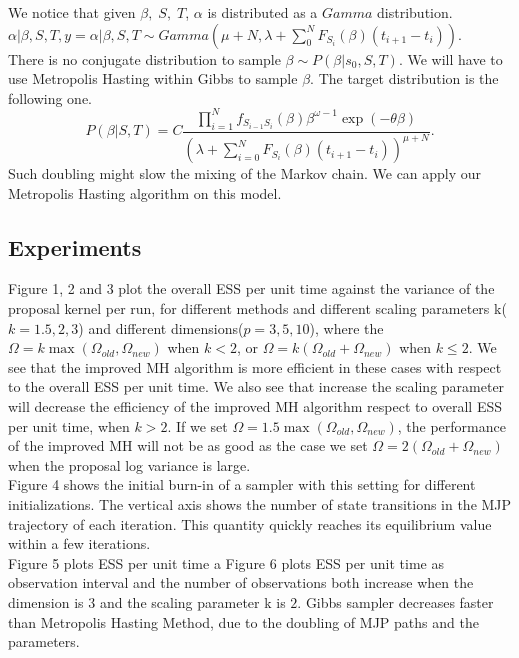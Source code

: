 We notice that given $\beta,\; S,\; T$, $\alpha$ is distributed as a $Gamma$ distribution.\\
$\alpha | \beta, S, T, y  = \alpha | \beta, S, T \sim Gamma(\mu + N, \lambda + \sum_{0}^NF_{S_i}(\beta)(t_{i + 1} - t_i))$.\\
There is no conjugate distribution to sample $\beta \sim P(\beta| s_0, S, T)$. We will have to use Metropolis Hasting within Gibbs to sample $\beta$. The target distribution is the following one.
$$ P(\beta | S, T) = C \frac{\prod_{i = 1}^N f_{S_{i -1}S_i}(\beta)\beta^{\omega - 1} \exp(-\theta \beta)}{(\lambda + \sum_{i = 0}^{N} F_{S_i}(\beta)(t_{i + 1} - t_i))^{\mu + N}}.$$
Such doubling might slow the mixing of the Markov chain. We can apply our Metropolis Hasting algorithm on this model.
\subsection{Experiments}
Figure 1, 2 and 3 plot the overall  ESS per unit time against the variance of the proposal kernel per run, for different methods and different scaling parameters k($k = 1.5, 2, 3$) and different dimensions($p = 3, 5, 10$), where the  $\Omega = k \max(\Omega_{old}, \Omega_{new})$ when $k < 2$, or $\Omega = k (\Omega_{old} + \Omega_{new})$ when $k \leq 2$. We see that the improved MH algorithm is more efficient in these cases with respect to the overall ESS per unit time. We also see that increase the scaling parameter will decrease the efficiency of the improved MH algorithm respect to overall ESS per unit time, when $k > 2$. If we set $\Omega = 1.5 \max(\Omega_{old}, \Omega_{new})$, the performance of the improved MH will not be as good as the case we set $\Omega = 2(\Omega_{old} + \Omega_{new})$ when the proposal log variance is large.\\
Figure 4 shows the initial burn-in of a sampler with this setting for different initializations. The vertical axis shows the number of state transitions in the MJP trajectory of each iteration. This quantity quickly reaches its equilibrium value within a few iterations.\\

Figure 5 plots ESS per unit time a
Figure 6 plots ESS per unit time as observation interval and the number of observations both increase when the dimension is $3$ and the scaling parameter k is $2$. Gibbs sampler decreases faster than Metropolis Hasting Method, due to the doubling of MJP paths and the parameters. \\

